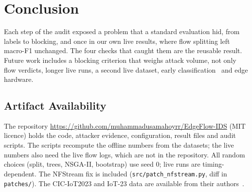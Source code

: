 \section{Conclusion}\label{sec:conclusion}

Each step of the audit exposed a problem that a standard evaluation hid, from labels to blocking, and once in our own live results, where flow splitting left macro-F1 unchanged. The four checks that caught them are the reusable result. Future work includes a blocking criterion that weighs attack volume, not only flow verdicts, longer live runs, a second live dataset, early classification~\cite{pekar2025early} and edge hardware.

\subsection{Artifact Availability}

The repository \url{https://github.com/muhammadusamahoyrr/EdgeFlow-IDS} (MIT licence) holds the code, attacker evidence, configuration, result files and audit scripts. The scripts recompute the offline numbers from the datasets; the live numbers also need the live flow logs, which are not in the repository. All random choices (split, trees, NSGA-II, bootstrap) use seed 0; live runs are timing-dependent. The NFStream fix is included (\nolinkurl{src/patch_nfstream.py}, diff in \nolinkurl{patches/}).
The CIC-IoT2023 and IoT-23 data are available from their authors~\cite{neto2023ciciot2023,garcia2020iot23}.
